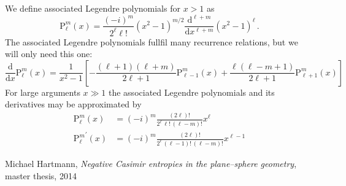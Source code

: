 \documentclass[10pt]{article}
\newcommand{\imag}{i} %
\newcommand{\Plm}[2]{{\text{P}_{#1}^{#2}}}
\begin{document}
We define associated Legendre polynomials for $x>1$ as
\begin{equation}
\Plm{\ell}{m}(x) = \frac{(-\imag)^m}{2^\ell \ell!} \left(x^2-1\right)^{m/2} \frac{\mathrm{d}^{\ell+m}}{\mathrm{d}x^{\ell+m}} \left(x^2-1\right)^\ell \,.
\end{equation}
The associated Legendre polynomials fullfil many recurrence relations, but we will only need this one:
\begin{equation}
\label{appendix:dPlm}
\frac{\mathrm{d}}{\mathrm{d}x} \Plm{\ell}{m}(x) = \frac{1}{x^2-1} \left[ -\frac{(\ell+1)(\ell+m)}{2\ell+1} \Plm{\ell-1}{m}(x) + \frac{\ell(\ell-m+1)}{2\ell+1} \Plm{\ell+1}{m}(x) \right]
\end{equation}
For large arguments $x\gg 1$ the associated Legendre polynomials and its derivatives may be approximated by
\begin{align}
\label{appendix:Plm_gg}
\Plm{\ell}{m}(x)        &= (-\imag)^m \frac{(2\ell)!}{2^\ell \, \ell! \, (\ell-m)!} x^\ell \\
\label{appendix:dPlm_gg}
\Plm{\ell}{m}^\prime(x) &= (-\imag)^m \frac{(2\ell)!}{2^\ell \, (\ell-1)! \, (\ell-m)! } x^{\ell-1}
\end{align}



\begin{thebibliography}{9}

  Michael Hartmann,
  \emph{Negative Casimir entropies in the plane–sphere geometry}, master thesis, 2014

\end{thebibliography}
\end{document}
